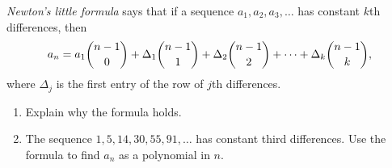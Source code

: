 \emph{Newton's little formula} says that if a sequence $a_1,a_2,a_3,\dots$ has constant $k$th differences, then
\[
a_n=a_1\dbinom{n-1}{0}+\Delta_1\dbinom{n-1}{1}+\Delta_2\dbinom{n-1}{2}+\dots+\Delta_k\dbinom{n-1}{k},
\]
where $\Delta_j$ is the first entry of the row of $j$th differences.
\begin{enumerate}
\item[(a)] Explain why the formula holds.
\item[(b)] The sequence $1, 5, 14, 30, 55, 91,\dots$ has constant third differences. Use the formula to find $a_n$ as a polynomial in $n$.
\end{enumerate}
